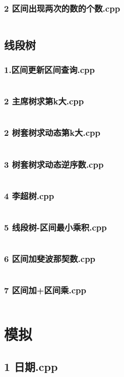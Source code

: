 \documentclass[a4paper,11pt]{article}
\begin{document}
\subsubsection{2 区间出现两次的数的个数.cpp}
\inputminted[breaklines]{c++}{"D:/tmplz/templates/数据结构/树状数组/2 区间出现两次的数的个数.cpp"}
\subsection{线段树}
\subsubsection{1.区间更新区间查询.cpp}
\inputminted[breaklines]{c++}{"D:/tmplz/templates/数据结构/线段树/1.区间更新区间查询.cpp"}
\subsubsection{2 主席树求第k大.cpp}
\inputminted[breaklines]{c++}{"D:/tmplz/templates/数据结构/线段树/2 主席树求第k大.cpp"}
\subsubsection{2 树套树求动态第k大.cpp}
\inputminted[breaklines]{c++}{"D:/tmplz/templates/数据结构/线段树/2 树套树求动态第k大.cpp"}
\subsubsection{3 树套树求动态逆序数.cpp}
\inputminted[breaklines]{c++}{"D:/tmplz/templates/数据结构/线段树/3 树套树求动态逆序数.cpp"}
\subsubsection{4 李超树.cpp}
\inputminted[breaklines]{c++}{"D:/tmplz/templates/数据结构/线段树/4 李超树.cpp"}
\subsubsection{5 线段树-区间最小乘积.cpp}
\inputminted[breaklines]{c++}{"D:/tmplz/templates/数据结构/线段树/5 线段树-区间最小乘积.cpp"}
\subsubsection{6 区间加斐波那契数.cpp}
\inputminted[breaklines]{c++}{"D:/tmplz/templates/数据结构/线段树/6 区间加斐波那契数.cpp"}
\subsubsection{7 区间加+区间乘.cpp}
\inputminted[breaklines]{c++}{"D:/tmplz/templates/数据结构/线段树/7 区间加+区间乘.cpp"}
\section{模拟}
\subsection{1 日期.cpp}
\inputminted[breaklines]{c++}{"D:/tmplz/templates/模拟/1 日期.cpp"}
\end{document}
